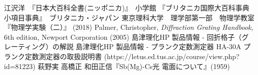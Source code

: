 \documentclass[11pt,a4paper]{jsarticle}
\begin{document}
\begin{thebibliography}{9}
  江沢洋　『日本大百科全書(ニッポニカ)』　小学館
  『ブリタニカ国際大百科事典 小項目事典』　ブリタニカ・ジャパン
  東京理科大学　理学部第一部　物理学教室 『物理学実験（二）』 (2018)
	Palmer, Christopher, {\sl Diffraction Grating Handbook}, 6th edition, Newport Corporation (2005)
	島津理化HP 製品情報 - 回折格子（グレーティング）の解説
	島津理化HP 製品情報 - プランク定数測定器 HA-30A
	プランク定数測定器の取扱説明書
	 (https://letus.ed.tus.ac.jp/course/view.php?id=81223)
	萩野実 高橋正 和田正信『Sb(Mg)-Cs光 電面について』(1959)
	\end{thebibliography}
\end{document}
